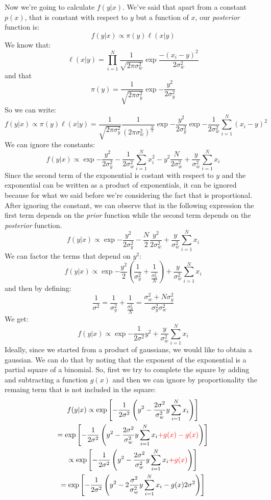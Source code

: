 Now we're going to calculate $f(y|x)$. We've said that apart from a constant $p(x)$, that is constant with respect to $y$ but a function of $x$, our \textit{posterior} function is:
\[
    f(y|x) \propto \pi(y) \ell(x|y)
\]
We know that:
\[
    \ell(x|y) =  \prod_{i = 1}^{N} \frac{1}{\sqrt{2\pi \sigma^2_w}} \exp{\frac{-(x_i-y)^2}{2\sigma_w^2}}
\]
and that
\[
    \pi(y) = \frac{1}{\sqrt{2\pi\sigma_y^2}} \exp{-\frac{y^2}{2\sigma_y^2}}
\]
So we can write:
\[
    f(y|x) \propto \pi(y) \ell(x|y) = \frac{1}{\sqrt{2\pi\sigma_y^2}} \frac{1}{(2\pi\sigma_w^2)^{\frac{N}{2}}} \exp{-\frac{y^2}{2\sigma_y^2}} \exp{-\frac{1}{2\sigma_w^2} \sum_{i=1}^{N} (x_i-y)^2}
\]
We can ignore the constants:
\[
    f(y|x) \propto \exp{-\frac{y^2}{2\sigma^2_y} - \frac{1}{2\sigma_w^2} \sum_{i=1}^{N} x_i^2 - y^2 \frac{N}{2 \sigma_w^2} + \frac{y}{\sigma_w^2} \sum_{i=1}^{N} x_i}
\]
Since the second term of the exponential is costant with respect to $y$ and the exponential can be written as a product of exponentials, it can be ignored because for what we said before we're considering the fact that is proportional. After ignoring the constant, we can observe that in the following expression the first term depends on the \textit{prior} function while the second term depends on the \textit{posterior} function.
\[
    f(y|x) \propto \exp{-\frac{y^2}{2\sigma^2_y} - \frac{N}{2} \frac{y^2}{2 \sigma_w^2} + \frac{y}{\sigma_w^2} \sum_{i=1}^{N} x_i}
\]
We can factor the terms that depend on $y^2$:
\[
    f(y|x) \propto \exp{-\frac{y^2}{2}\left(\frac{1}{\sigma_y^2} + \frac{1}{\frac{\sigma^2_w}{N}}\right) + \frac{y}{\sigma_w^2} \sum_{i=1}^{N} x_i}
\]
and then by defining:
\[
    \frac{1}{\sigma^2} = \frac{1}{\sigma_y^2} + \frac{1}{\frac{\sigma^2_w}{N}} =  \frac{\sigma^2_w+N\sigma^2_y}{\sigma^2_y\sigma^2_w}
\]
We get:
\[
    f(y|x) \propto \exp{-\frac{1}{2\sigma^2} y^2 + \frac{y}{\sigma_w^2} \sum_{i=1}^N x_i}
\]
Ideally, since we started from a product of gaussians, we would like to obtain a gaussian. We can do that by noting that the exponent of the exponential is a partial square of a binomial.
So, first we try to complete the square by adding and subtracting a function $g(x)$ and then we can ignore by proportionality the remaing term that is not included in the square:
\begin{gather*}
    f(y|x) \propto \exp{-\frac{1}{2\sigma^2}\left(y^2 - \frac{2\sigma^2}{\sigma_w^2}y\sum_{i=1}^N x_i \right) } \\
    = \exp{-\frac{1}{2\sigma^2}\left(y^2 - \frac{2\sigma^2}{\sigma_w^2}y\sum_{i=1}^N x_i \textcolor{red}{+g(x)-g(x)}\right) } \\
    \propto \exp{-\frac{1}{2\sigma^2}\left(y^2 - \frac{2\sigma^2}{\sigma_w^2}y\sum_{i=1}^N x_i \textcolor{red}{+g(x)}\right) } \\
    = \exp{-\frac{1}{2\sigma^2} \left(y^2 - 2\frac{\sigma^2}{\sigma_w^2}y\sum_{i=1}^N x_i - g(x)2\sigma^2\right)}
\end{gather*}
